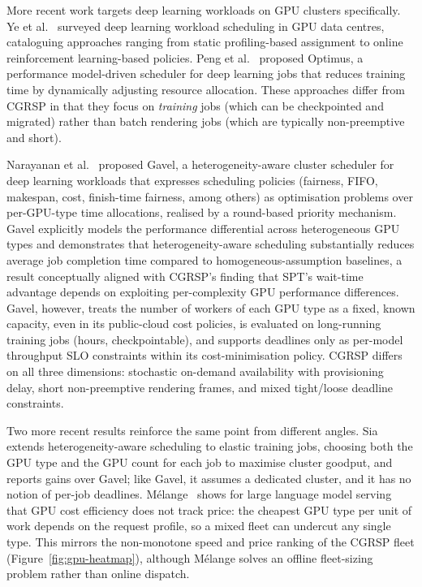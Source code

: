 More recent work targets deep learning workloads on GPU clusters specifically. Ye et al.~\cite{ye2024deep} surveyed deep learning workload scheduling in GPU data centres, cataloguing approaches ranging from static profiling-based assignment to online reinforcement learning-based policies. Peng et al.~\cite{peng2018optimus} proposed Optimus, a performance model-driven scheduler for deep learning jobs that reduces training time by dynamically adjusting resource allocation. These approaches differ from CGRSP in that they focus on \emph{training} jobs (which can be checkpointed and migrated) rather than batch rendering jobs (which are typically non-preemptive and short).

Narayanan et al.~\cite{narayanan2020gavel} proposed Gavel, a heterogeneity-aware cluster scheduler for deep learning workloads that expresses scheduling policies (fairness, FIFO, makespan, cost, finish-time fairness, among others) as optimisation problems over per-GPU-type time allocations, realised by a round-based priority mechanism. Gavel explicitly models the performance differential across heterogeneous GPU types and demonstrates that heterogeneity-aware scheduling substantially reduces average job completion time compared to homogeneous-assumption baselines, a result conceptually aligned with CGRSP's finding that SPT's wait-time advantage depends on exploiting per-complexity GPU performance differences. Gavel, however, treats the number of workers of each GPU type as a fixed, known capacity, even in its public-cloud cost policies, is evaluated on long-running training jobs (hours, checkpointable), and supports deadlines only as per-model throughput SLO constraints within its cost-minimisation policy. CGRSP differs on all three dimensions: stochastic on-demand availability with provisioning delay, short non-preemptive rendering frames, and mixed tight/loose deadline constraints.

Two more recent results reinforce the same point from different angles. Sia~\cite{jayaramsubramanya2023sia} extends heterogeneity-aware scheduling to elastic training jobs, choosing both the GPU type and the GPU count for each job to maximise cluster goodput, and reports gains over Gavel; like Gavel, it assumes a dedicated cluster, and it has no notion of per-job deadlines. M\'elange~\cite{griggs2024melange} shows for large language model serving that GPU cost efficiency does not track price: the cheapest GPU type per unit of work depends on the request profile, so a mixed fleet can undercut any single type. This mirrors the non-monotone speed and price ranking of the CGRSP fleet (Figure~\ref{fig:gpu-heatmap}), although M\'elange solves an offline fleet-sizing problem rather than online dispatch.

